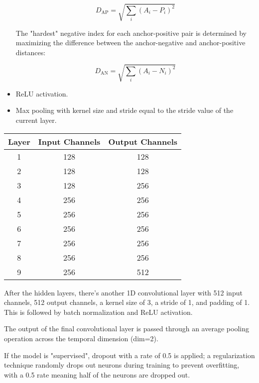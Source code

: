 \begin{itemize}
\begin{equation}
D_{\text{AP}} = \sqrt{\sum_{i} (A_i - P_i)^2}
\end{equation}

The "hardest" negative index for each anchor-positive pair is determined by maximizing the difference between the anchor-negative and anchor-positive distances:

\begin{equation}
D_{\text{AN}} = \sqrt{\sum_{i} (A_i - N_i)^2}
\end{equation}

    
\item ReLU activation. 

    
\item Max pooling with kernel size and stride equal to the stride value of the current layer.
\end{itemize}

\begin{tabular}{|c|c|c|}
\hline
\textbf{Layer} & \textbf{Input Channels} & \textbf{Output Channels} \\
\hline
1 & 128 & 128 \\
\hline
2 & 128 & 128 \\
\hline
3 & 128 & 256 \\
\hline
4 & 256 & 256 \\
\hline
5 & 256 & 256 \\
\hline
6 & 256 & 256 \\
\hline
7 & 256 & 256 \\
\hline
8 & 256 & 256 \\
\hline
9 & 256 & 512 \\
\hline
\end{tabular}

After the hidden layers, there's another 1D convolutional layer with 512 input channels, 512 output channels, a kernel size of 3, a stride of 1, and padding of 1. This is followed by batch normalization and ReLU activation.

The output of the final convolutional layer is passed through an average pooling operation across the temporal dimension (dim=2).

If the model is "supervised", dropout with a rate of 0.5 is applied; a regularization technique randomly drops out neurons during training to prevent overfitting, with a 0.5 rate meaning half of the neurons are dropped out.



